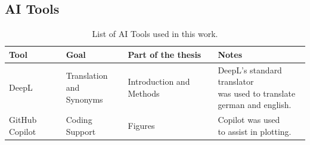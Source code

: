 \subsection{AI Tools}
\begin{table}[h]
    \caption{List of AI Tools used in this work.}
    \begin{tabular}{llll}
        \hline
        Tool & Goal & Part of the thesis & Notes\\
        \hline
        DeepL & \makecell{Translation\\and\\Synonyms} & Introduction and Methods & \makecell{DeepL's standard translator\\was used to translate\\german and english.} \\
        GitHub Copilot & Coding Support & Figures & \makecell{Copilot was used\\to assist in plotting.}\\
    \end{tabular}
\end{table}